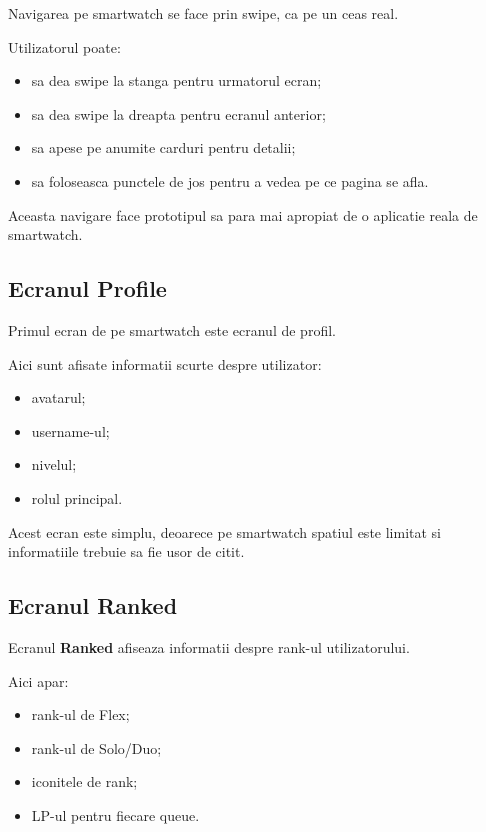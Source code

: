 \documentclass[12pt,a4paper]{article}
\begin{document}
Navigarea pe smartwatch se face prin swipe, ca pe un ceas real.

Utilizatorul poate:

\begin{itemize}
    \item sa dea swipe la stanga pentru urmatorul ecran;
    \item sa dea swipe la dreapta pentru ecranul anterior;
    \item sa apese pe anumite carduri pentru detalii;
    \item sa foloseasca punctele de jos pentru a vedea pe ce pagina se afla.
\end{itemize}

Aceasta navigare face prototipul sa para mai apropiat de o aplicatie reala de smartwatch.

\subsection{Ecranul Profile}

Primul ecran de pe smartwatch este ecranul de profil.

Aici sunt afisate informatii scurte despre utilizator:

\begin{itemize}
    \item avatarul;
    \item username-ul;
    \item nivelul;
    \item rolul principal.
\end{itemize}

Acest ecran este simplu, deoarece pe smartwatch spatiul este limitat si informatiile trebuie sa fie usor de citit.

\subsection{Ecranul Ranked}

Ecranul \textbf{Ranked} afiseaza informatii despre rank-ul utilizatorului.

Aici apar:

\begin{itemize}
    \item rank-ul de Flex;
    \item rank-ul de Solo/Duo;
    \item iconitele de rank;
    \item LP-ul pentru fiecare queue.
\end{itemize}
\end{document}
